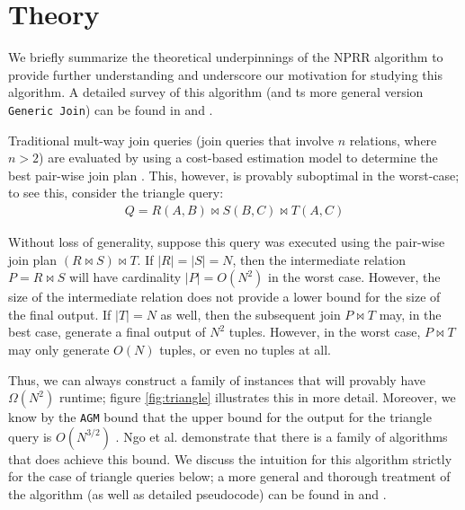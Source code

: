 \section{Theory}

We briefly summarize the theoretical underpinnings of the NPRR algorithm to provide further understanding and underscore our motivation for studying this algorithm. A detailed survey of this algorithm (and ts more general version \texttt{Generic Join}) can be found in \cite{ngo2014skew} and \cite{ngo2012worst}.

Traditional mult-way join queries (join queries that involve $n$ relations, where $n > 2$) are evaluated by using a cost-based estimation model to determine the best pair-wise join plan \cite{shapiro1986join}. This, however, is provably suboptimal in the worst-case; to see this, consider the triangle query:
\begin{align*}
Q = R(A, B) \bowtie S(B, C) \bowtie T(A, C)  
\end{align*}

Without loss of generality, suppose this query was executed using the pair-wise join plan $(R \bowtie S) \bowtie T$. If $|R| = |S| = N$, then the intermediate relation $P = R \bowtie S$ will have cardinality $|P| = O(N^2)$ in the worst case. However, the size of the intermediate relation does not provide a lower bound for the size of the final output. If $|T| = N$ as well, then the subsequent join $P \bowtie T$ may, in the best case, generate a final output of $N^2$ tuples. However, in the worst case, $P \bowtie T$ may only generate $O(N)$ tuples, or even no tuples at all.

Thus, we can always construct a family of instances that will provably have $\Omega(N^2)$ runtime; figure \ref{fig:triangle} illustrates this in more detail. Moreover, we know by the \texttt{AGM} bound that the upper bound for the output for the triangle query is $O(N^{3/2})$ \cite{atserias2008size}. Ngo et al. demonstrate that there is a family of algorithms that does achieve this bound. We discuss the intuition for this algorithm strictly for the case of triangle queries below; a more general and thorough treatment of the algorithm (as well as detailed pseudocode) can be found in \cite{ngo2012worst} and \cite{ngo2014skew}.

